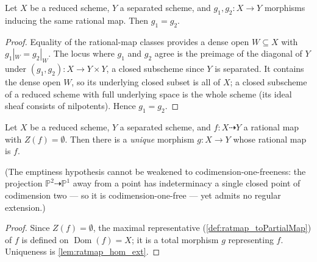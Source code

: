 \begin{lemma}
  \label{lem:ratmap_hom_ext}
  \leanok
  Let \(X\) be a reduced scheme, \(Y\) a separated scheme, and
  \(g_1, g_2 : X \to Y\) morphisms inducing the same rational map. Then
  \(g_1 = g_2\).
\end{lemma}
\begin{proof}
  \leanok
  Equality of the rational-map classes provides a dense open
  \(W \subseteq X\) with \(g_1|_W = g_2|_W\). The locus where \(g_1\) and
  \(g_2\) agree is the preimage of the diagonal of \(Y\) under
  \((g_1, g_2) : X \to Y \times Y\), a closed subscheme since \(Y\) is
  separated. It contains the dense open \(W\), so its underlying closed subset
  is all of \(X\); a closed subscheme of a reduced scheme with full underlying
  space is the whole scheme (its ideal sheaf consists of nilpotents). Hence
  \(g_1 = g_2\).
\end{proof}

\begin{theorem}
  \label{thm:extension_unique_of_empty}
  \leanok
  Let \(X\) be a reduced scheme, \(Y\) a separated scheme, and
  \(f : X \dashrightarrow Y\) a rational map with \(Z(f) = \emptyset\). Then
  there is a \emph{unique} morphism \(g : X \to Y\) whose rational map is
  \(f\).

  (The emptiness hypothesis cannot be weakened to
  codimension-one-freeness: the projection
  \(\mathbb P^2 \dashrightarrow \mathbb P^1\) away from a point has
  indeterminacy a single closed point of codimension two --- so it is
  codimension-one-free --- yet admits no regular extension.)
\end{theorem}
\begin{proof}
  \leanok
  Since \(Z(f) = \emptyset\), the maximal representative
  (\ref{def:ratmap_toPartialMap}) of \(f\) is defined on
  \(\operatorname{Dom}(f) = X\); it is a total morphism \(g\) representing
  \(f\). Uniqueness is \ref{lem:ratmap_hom_ext}.
\end{proof}

